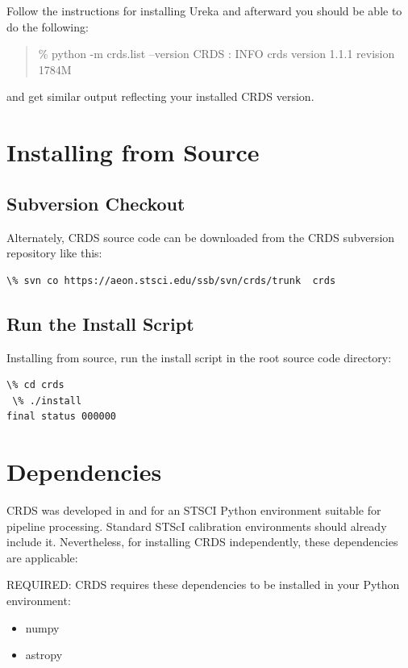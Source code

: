 \documentclass[letterpaper,10pt,english]{sphinxmanual}
\begin{document}
Follow the instructions for installing Ureka and afterward you should be able to do the following:
\begin{quote}

\% python -m crds.list --version
CRDS  : INFO     crds version 1.1.1 revision 1784M
\end{quote}

and get similar output reflecting your installed CRDS version.


\section{Installing from Source}
\label{installation:installing-from-source}

\subsection{Subversion Checkout}
\label{installation:subversion-checkout}
Alternately, CRDS source code can be downloaded from the CRDS subversion repository like this:

\begin{Verbatim}[commandchars=\\\{\}]
\% svn co https://aeon.stsci.edu/ssb/svn/crds/trunk  crds
\end{Verbatim}


\subsection{Run the Install Script}
\label{installation:run-the-install-script}
Installing from source,  run the install script in the root source code directory:

\begin{Verbatim}[commandchars=\\\{\}]
 \% cd crds
 \% ./install
final status 000000
\end{Verbatim}


\section{Dependencies}
\label{installation:dependencies}
CRDS was developed in and for an STSCI Python environment suitable for pipeline
processing.   Standard STScI calibration environments should already include it.
Nevertheless, for installing CRDS independently, these dependencies are applicable:

REQUIRED: CRDS requires these dependencies to be installed in your Python environment:
\begin{itemize}
\item {} 
numpy

\item {} 
astropy

\end{itemize}
\end{document}
